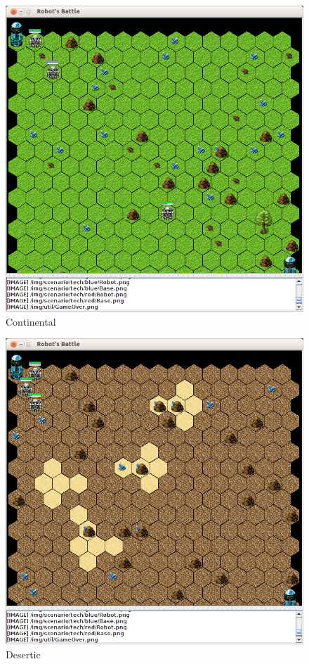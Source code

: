 \documentclass[a4paper]{article}
\begin{document}
{{{{{{\begin{figure}[h]
   	\centering
    \includegraphics[scale=0.3]{img/continental.png}
    \caption{Continental}
\end{figure}

\newpage %

\begin{figure}[h]
   	\centering
    \includegraphics[scale=0.3]{img/desertic.png}
    \caption{Desertic}
\end{figure}

}}}}}}
\end{document}
